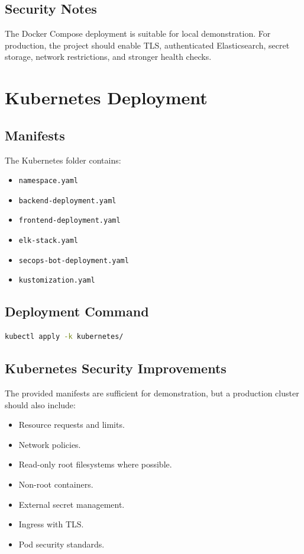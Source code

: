\documentclass[12pt,a4paper]{report}
\begin{document}
\section{Security Notes}

The Docker Compose deployment is suitable for local demonstration. For production, the project should enable TLS, authenticated Elasticsearch, secret storage, network restrictions, and stronger health checks.

\chapter{Kubernetes Deployment}

\section{Manifests}

The Kubernetes folder contains:

\begin{itemize}[leftmargin=*]
    \item \texttt{namespace.yaml}
    \item \texttt{backend-deployment.yaml}
    \item \texttt{frontend-deployment.yaml}
    \item \texttt{elk-stack.yaml}
    \item \texttt{secops-bot-deployment.yaml}
    \item \texttt{kustomization.yaml}
\end{itemize}

\section{Deployment Command}

\begin{lstlisting}[language=bash,caption={Deploy with Kustomize}]
kubectl apply -k kubernetes/
\end{lstlisting}

\section{Kubernetes Security Improvements}

The provided manifests are sufficient for demonstration, but a production cluster should also include:

\begin{itemize}[leftmargin=*]
    \item Resource requests and limits.
    \item Network policies.
    \item Read-only root filesystems where possible.
    \item Non-root containers.
    \item External secret management.
    \item Ingress with TLS.
    \item Pod security standards.
\end{itemize}
\end{document}
